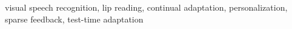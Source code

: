 \documentclass[10pt,journal]{IEEEtran}
\begin{document}
\begin{IEEEkeywords}
visual speech recognition, lip reading, continual adaptation, personalization, sparse feedback, test-time adaptation
\end{IEEEkeywords}










\end{document}
